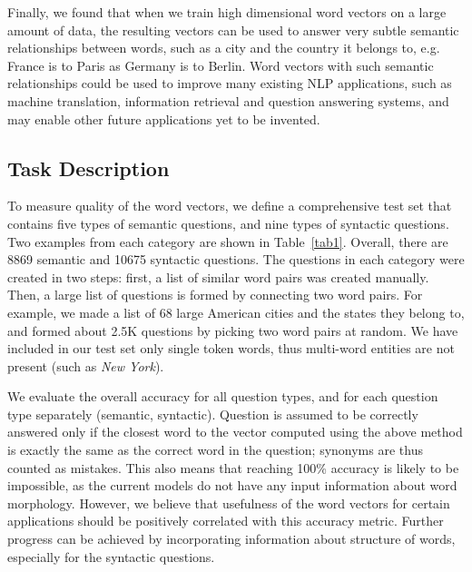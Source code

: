 \documentclass{article} %
\begin{document}
Finally, we found that when we train high dimensional word vectors on a large amount of data, the resulting vectors can be used to answer very subtle semantic relationships between words, such as a city and the
country it belongs to, e.g. France is to Paris as Germany is to Berlin. Word vectors with such semantic relationships could be used to improve many existing NLP applications, such as machine translation, information retrieval
and question answering systems, and may enable other future applications yet to be invented. %

\subsection{Task Description}


To measure quality of the word vectors, we define a comprehensive test set that contains five types of semantic questions, and nine types of syntactic questions. Two examples from each category are shown in Table~\ref{tab1}. Overall,
there are 8869 semantic and 10675 syntactic questions. The questions in each category were created in two steps: first, a list of similar word pairs was created manually. Then, a large list of questions is formed by connecting
two word pairs. %
For example, we made a list of 68 large American cities and the states they belong to, and formed about 2.5K questions by picking two word pairs at random. We have included in our test set only single token words,
thus multi-word entities are not present (such as {\it New York}). %

We evaluate the overall accuracy for all question types, and for each question type separately (semantic, syntactic). Question is assumed to be correctly answered only if the closest
word to the vector computed using the above method is exactly the same as the correct word in the question; synonyms are thus counted as mistakes. This also means that reaching 100\% accuracy is likely to
be impossible, as the current models do not have any input information about word morphology.
However, we believe that usefulness of the word vectors for certain applications should be positively correlated with this accuracy metric. Further progress can be achieved by incorporating
information about structure of words, especially for the syntactic questions.
\end{document}
